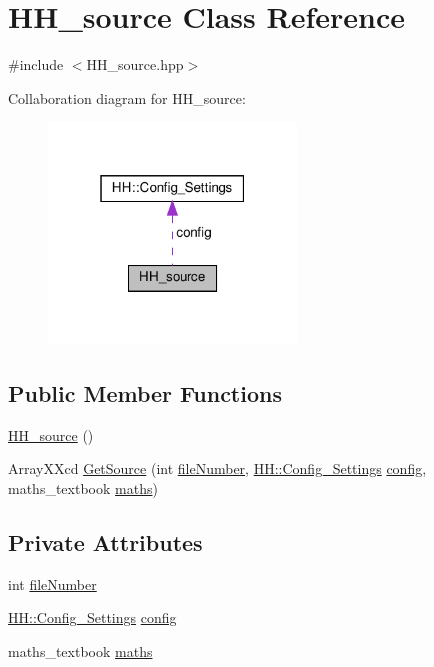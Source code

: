 \hypertarget{class_h_h__source}{}\section{H\+H\+\_\+source Class Reference}
\label{class_h_h__source}


{\ttfamily \#include $<$H\+H\+\_\+source.\+hpp$>$}



Collaboration diagram for H\+H\+\_\+source\+:
\nopagebreak
\begin{figure}[H]
\begin{center}
\leavevmode
\includegraphics[width=187pt]{class_h_h__source__coll__graph}
\end{center}
\end{figure}
\subsection*{Public Member Functions}
\begin{DoxyCompactItemize}
\item 
\hyperlink{class_h_h__source_a0b3c052d274495b4f90fb09d15fff9fa}{H\+H\+\_\+source} ()
\item 
Array\+X\+Xcd \hyperlink{class_h_h__source_a059c934be1aaa0ed411fea5374bb2428}{Get\+Source} (int \hyperlink{class_h_h__source_a6631481cc1bea05ab564cb1841644a12}{file\+Number}, \hyperlink{class_h_h_1_1_config___settings}{H\+H\+::\+Config\+\_\+\+Settings} \hyperlink{class_h_h__source_adbab95c09c583e2aeebbb4679e6998e8}{config}, maths\+\_\+textbook \hyperlink{class_h_h__source_a93637ad30af846dd04eb741437114f8f}{maths})
\end{DoxyCompactItemize}
\subsection*{Private Attributes}
\begin{DoxyCompactItemize}
\item 
int \hyperlink{class_h_h__source_a6631481cc1bea05ab564cb1841644a12}{file\+Number}
\item 
\hyperlink{class_h_h_1_1_config___settings}{H\+H\+::\+Config\+\_\+\+Settings} \hyperlink{class_h_h__source_adbab95c09c583e2aeebbb4679e6998e8}{config}
\item 
maths\+\_\+textbook \hyperlink{class_h_h__source_a93637ad30af846dd04eb741437114f8f}{maths}
\end{DoxyCompactItemize}


